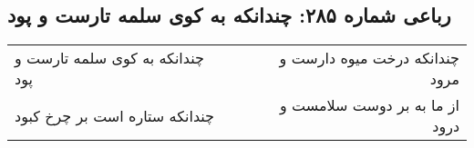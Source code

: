 \begin{center}
\section*{رباعی شماره ۲۸۵: چندانکه به کوی سلمه تارست و پود}
\label{sec:sh285}
\begin{longtable}{l p{0.5cm} r}
چندانکه به کوی سلمه تارست و پود
&&
چندانکه درخت میوه دارست و مرود
\\
چندانکه ستاره است بر چرخ کبود
&&
از ما به بر دوست سلامست و درود
\\
\end{longtable}
\end{center}
